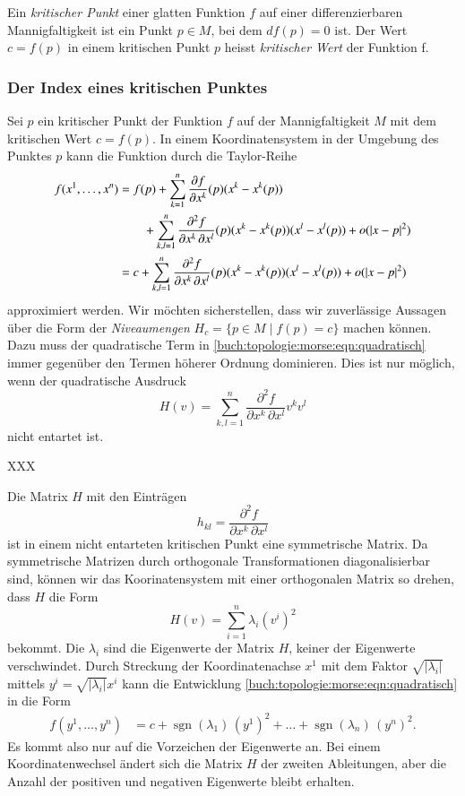 \begin{definition}
%
%
%
%
Ein \emph{kritischer Punkt} einer glatten Funktion $f$ auf einer
differenzierbaren Mannigfaltigkeit ist ein Punkt $p\in M$, bei dem
$df(p)=0$ ist.
Der Wert $c=f(p)$ in einem kritischen Punkt $p$ heisst
\emph{kritischer Wert} der Funktion f.
\end{definition}

%
%
\subsubsection{Der Index eines kritischen Punktes}
Sei $p$ ein kritischer Punkt der Funktion $f$ auf der Mannigfaltigkeit $M$
mit dem kritischen Wert $c=f(p)$.
In einem Koordinatensystem in der Umgebung des Punktes $p$ kann die Funktion
durch die Taylor-Reihe 
\begin{align}
f(x^1,\dots,x^n)
&=
f(p)
+
\sum_{k=1}^n \frac{\partial f}{\partial x^k}(p) (x^k-x^k(p))
\\
&\qquad\mathstrut
+
\sum_{k,l=1}^n
\frac{\partial^2 f}{\partial x^k\,\partial x^l}(p)
(x^k-x^k(p))(x^l-x^l(p))
+
o(|x-p|^2)
\notag
\\
&=
c
+
\sum_{k,l=1}^n
\frac{\partial^2 f}{\partial x^k\,\partial x^l}(p)
(x^k-x^k(p))(x^l-x^l(p))
+
o(|x-p|^2)
\label{buch:topologie:morse:eqn:quadratisch}
\end{align}
approximiert werden.
Wir möchten sicherstellen, dass wir zuverlässige Aussagen über die
Form der \emph{Niveaumengen} $H_c=\{p\in M\mid f(p)=c\}$ machen können.
Dazu muss der quadratische Term in
\eqref{buch:topologie:morse:eqn:quadratisch}
immer gegenüber den Termen höherer Ordnung dominieren.
Dies ist nur möglich, wenn der quadratische Ausdruck
\[
H(v)
=
\sum_{k,l=1}^n
\frac{\partial^2 f}{\partial x^k\,\partial x^l}
v^k v^l
\]
nicht entartet ist.

\begin{definition}
XXX
\end{definition}

Die Matrix $H$ mit den Einträgen
\[
h_{kl} = \frac{\partial^2 f}{\partial x^k\,\partial x^l}
\]
ist in einem nicht entarteten kritischen Punkt eine symmetrische
Matrix.
Da symmetrische Matrizen durch orthogonale Transformationen
diagonalisierbar sind, können wir das Koorinatensystem mit
einer orthogonalen Matrix so drehen, dass $H$ die Form
\[
H(v)
=
\sum_{i=1}^n \lambda_i (v^i)^2
\]
bekommt.
Die $\lambda_i$ sind die Eigenwerte der Matrix $H$, keiner
der Eigenwerte verschwindet.
Durch Streckung der Koordinatenachse $x^1$ mit dem Faktor
$\!\sqrt{|\lambda_i|}$  mittels
$y^i = \!\sqrt{|\lambda_i|}x^i$ kann die Entwicklung
\eqref{buch:topologie:morse:eqn:quadratisch}
in die Form
\begin{align*}
f(y^1,\dots,y^n)
&=
c
+
\operatorname{sgn}(\lambda_1)\,(y^1)^2
+
\dots
+
\operatorname{sgn}(\lambda_n)\,(y^n)^2.
\end{align*}
Es kommt also nur auf die Vorzeichen der Eigenwerte an.
Bei einem Koordinatenwechsel ändert sich die Matrix $H$ der zweiten
Ableitungen, aber die Anzahl der positiven und negativen Eigenwerte
bleibt erhalten.

